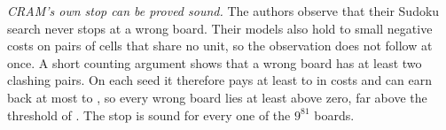 \emph{CRAM's own stop can be proved sound.} The authors observe that their Sudoku search never stops at a wrong board.
Their models also hold  to  small negative costs on pairs of cells that share no unit, so
the observation does not follow at once. A short counting argument shows that a wrong board has at least two clashing
pairs. On each seed it therefore pays at least  to  in costs and can earn back
at most  to , so every wrong board lies at least 
above zero, far above the threshold of . The stop is sound for every one of the $9^{81}$ boards.
